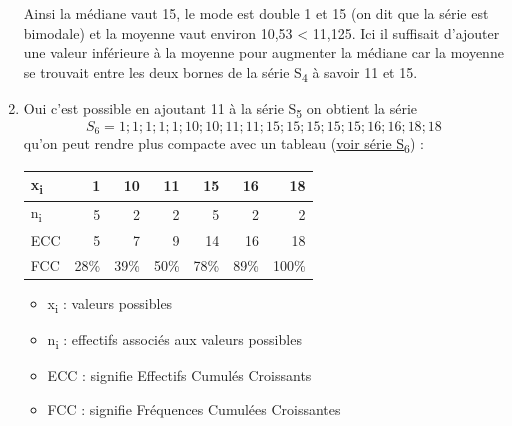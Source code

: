 \documentclass[11pt]{article}
\begin{document}
\begin{enumerate}
Ainsi la médiane vaut 15, le mode est double 1 et 15 (on dit
que la série est bimodale) et la moyenne vaut environ 10,53 <
11,125. Ici il suffisait d'ajouter une valeur inférieure à la
moyenne pour augmenter la médiane car la moyenne se trouvait
entre les deux bornes de la série S\textsubscript{4} à savoir 11 et 15.
\item Oui c'est possible en ajoutant 11 à la série S\textsubscript{5} on obtient la
série \[S_6 = {1 ; 1 ; 1 ; 1 ; 1 ; 10 ; 10 ; 11 ; 11 ; 15 ; 15 ;
   15 ; 15 ; 15 ; 16 ; 16 ; 18 ; 18}\] qu'on peut rendre plus
compacte avec un tableau (\hyperref[org9cda839]{voir série S\textsubscript{6}}) :
\label{org9cda839}
\begin{center}
\begin{tabular}{lrrrrrr}
\hline
x\textsubscript{i} & 1 & 10 & 11 & 15 & 16 & 18\\[0pt]
\hline
n\textsubscript{i} & 5 & 2 & 2 & 5 & 2 & 2\\[0pt]
\hline
ECC & 5 & 7 & 9 & 14 & 16 & 18\\[0pt]
\hline
FCC & 28\% & 39\% & 50\% & 78\% & 89\% & 100\%\\[0pt]
\hline
\end{tabular}
\end{center}

\begin{itemize}
\item x\textsubscript{i} : valeurs possibles
\item n\textsubscript{i} : effectifs associés aux valeurs possibles
\item ECC : signifie Effectifs Cumulés Croissants
\item FCC : signifie Fréquences Cumulées Croissantes
\end{itemize}


\end{enumerate}
\end{document}

